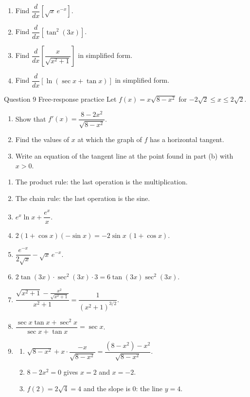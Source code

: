 \documentclass[11pt]{article}
\begin{document}
\begin{enumerate}[leftmargin=*,itemsep=2pt,start=5]
  \item Find $\dfrac{d}{dx}\left[\sqrt{x}\,e^{-x}\right]$.\work{2.8cm}
  \item Find $\dfrac{d}{dx}\left[\tan^2(3x)\right]$.\work{2.8cm}
  \item Find $\dfrac{d}{dx}\left[\dfrac{x}{\sqrt{x^2+1}}\right]$ in simplified form.\work{2.8cm}
  \item Find $\dfrac{d}{dx}[\ln(\sec x+\tan x)]$ in simplified form.\work{2.8cm}
\end{enumerate}

\begin{frbox}{Question 9 \textperiodcentered{} Free-response practice}
Let $f(x)=x\sqrt{8-x^2}$ for $-2\sqrt2\le x\le2\sqrt2$.
\begin{enumerate}[label=(\alph*),leftmargin=*,itemsep=2pt]
  \item Show that $f'(x)=\dfrac{8-2x^2}{\sqrt{8-x^2}}$.\work{2.6cm}
  \item Find the values of $x$ at which the graph of $f$ has a horizontal tangent.\work{2.6cm}
  \item Write an equation of the tangent line at the point found in part (b) with $x>0$.\work{2.6cm}
\end{enumerate}
\end{frbox}

\newpage
\begin{solbox}
\begin{enumerate}[leftmargin=*,itemsep=4pt]
  \item The product rule: the last operation is the multiplication.
  \item The chain rule: the last operation is the sine.
  \item $e^{x}\ln x+\dfrac{e^{x}}{x}$.
  \item $2(1+\cos x)(-\sin x)=-2\sin x\,(1+\cos x)$.
  \item $\dfrac{e^{-x}}{2\sqrt x}-\sqrt x\,e^{-x}$.
  \item $2\tan(3x)\cdot\sec^2(3x)\cdot3=6\tan(3x)\sec^2(3x)$.
  \item $\dfrac{\sqrt{x^2+1}-\frac{x^2}{\sqrt{x^2+1}}}{x^2+1}=\dfrac{1}{\left(x^2+1\right)^{3/2}}$.
  \item $\dfrac{\sec x\tan x+\sec^2x}{\sec x+\tan x}=\sec x$.
  \item \begin{enumerate}[label=(\alph*),leftmargin=*,itemsep=3pt]
    \item $\sqrt{8-x^2}+x\cdot\dfrac{-x}{\sqrt{8-x^2}}=\dfrac{\left(8-x^2\right)-x^2}{\sqrt{8-x^2}}$.
    \item $8-2x^2=0$ gives $x=2$ and $x=-2$.
    \item $f(2)=2\sqrt4=4$ and the slope is 0: the line $y=4$.
  \end{enumerate}
\end{enumerate}
\end{solbox}
\end{document}
